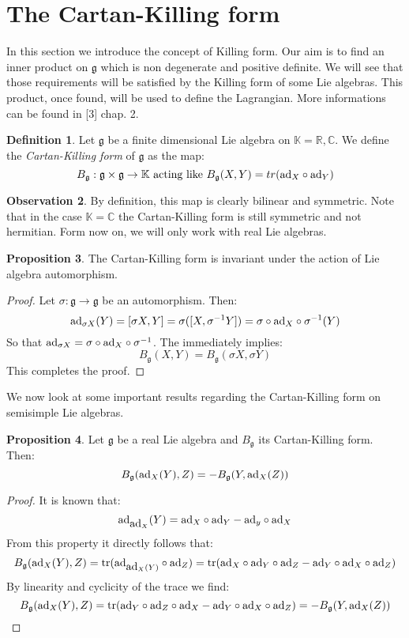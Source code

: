 \documentclass[12pt,a4paper]{report}
\theoremstyle{definition}
\newtheorem{Def}{Definition}[chapter]
\theoremstyle{Theorem}
\newtheorem{Prop}[Def]{Proposition}
\theoremstyle{definition}
\theoremstyle{definition}
\newtheorem{Obs}[Def]{Observation}
\begin{document}
	\section{The Cartan-Killing form}
	In this section we introduce the concept of Killing form. Our aim is to find an inner product on $\mathfrak{g}$ which is non degenerate and positive definite. We will see that those requirements will be satisfied by the Killing form of some Lie algebras. This product, once found, will be used to define the Lagrangian. More informations can be found in [3] chap. 2.
	\begin{Def}
		Let $\mathfrak{g}$ be a finite dimensional Lie algebra on $\mathbb{K}=\mathbb{R},\mathbb{C}$. We define the \textit{Cartan-Killing form} of $\mathfrak{g}$ as the map:
		$$B_\mathfrak{g}:\mathfrak{g}\times \mathfrak{g}\rightarrow\mathbb{K}\hbox{ acting like } B_\mathfrak{g}(X,Y)=tr(\hbox{ad}_X\circ \hbox{ad}_Y)$$
	\end{Def}
	\begin{Obs}
		By definition, this map is clearly bilinear and symmetric. Note that in the case $\mathbb{K}=\mathbb{C}$ the Cartan-Killing form is still symmetric and not hermitian. Form now on, we will only work with real Lie algebras.
	\end{Obs} 
	\begin{Prop}\label{Prop_2.8.2}
		The Cartan-Killing form is invariant under the action of Lie algebra automorphism.
	\end{Prop}
	\begin{proof}
		Let $\sigma:\mathfrak{g}\rightarrow\mathfrak{g}$ be an automorphism. Then:
		$$\hbox{ad}_{\sigma X}(Y)=[\sigma X,Y]=\sigma([X,\sigma^{-1}Y])=\sigma\circ \hbox{ad}_X\circ \sigma^{-1}(Y)$$
		So that $\hbox{ad}_{\sigma X}=\sigma\circ \hbox{ad}_X\circ \sigma^{-1}$. The immediately implies:
		$$B_\mathfrak{g}(X,Y)=B_\mathfrak{g}(\sigma X,\sigma Y)$$
		This completes the proof.
	\end{proof}
	We now look at some important results regarding the Cartan-Killing form on semisimple Lie algebras.
	\begin{Prop}
		Let $\mathfrak{g}$ be a real Lie algebra and $B_\mathfrak{g}$ its Cartan-Killing form. Then:
		$$B_\mathfrak{g}(\hbox{ad}_X(Y),Z)=-B_\mathfrak{g}(Y,\hbox{ad}_X(Z))$$
	\end{Prop}
	\begin{proof}
		It is known that:
		$$\hbox{ad}_{\hbox{ad}_X}(Y)=\hbox{ad}_X\circ \hbox{ad}_Y-\hbox{ad}_y\circ \hbox{ad}_X$$
		From this property it directly follows that:
		$$B_\mathfrak{g}(\hbox{ad}_X(Y),Z)=\hbox{tr}(\hbox{ad}_{\hbox{ad}_X(Y)}\circ \hbox{ad}_Z)=\hbox{tr}(\hbox{ad}_X\circ \hbox{ad}_Y\circ \hbox{ad}_Z-\hbox{ad}_Y\circ\hbox{ad}_X\circ \hbox{ad}_Z)$$
		By linearity and cyclicity of the trace we find:
		$$B_\mathfrak{g}(\hbox{ad}_X(Y),Z)=\hbox{tr}(\hbox{ad}_Y\circ \hbox{ad}_Z\circ \hbox{ad}_X-\hbox{ad}_Y\circ\hbox{ad}_X\circ \hbox{ad}_Z)=-B_\mathfrak{g}(Y,\hbox{ad}_X(Z))$$
	\end{proof}
\end{document}

